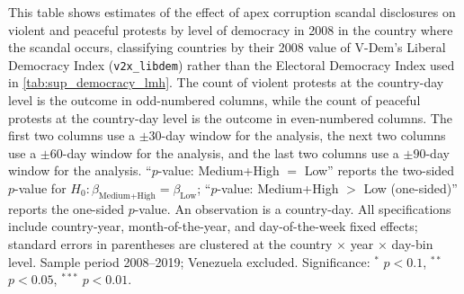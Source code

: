 \documentclass[11pt]{article}
\let\mathbetasym\beta
\renewcommand{\beta}{\ensuremath{\mathbetasym}}
\begin{document}
\begin{table}[htb!]
    \caption{Effect by 2008 level of democracy (Liberal index): Low vs.\ Medium+High.}
    \label{tab:sup_democracy_terciles_libdem_lmh}
    \begin{center}
        \scriptsize{}
    \end{center}
    \footnotesize{This table shows estimates of the effect of apex corruption scandal disclosures on violent and peaceful protests by level of democracy in 2008 in the country where the scandal occurs, classifying countries by their 2008 value of V-Dem's Liberal Democracy Index (\texttt{v2x\_libdem}) rather than the Electoral Democracy Index used in \autoref{tab:sup_democracy_lmh}. The count of violent protests at the country-day level is the outcome in odd-numbered columns, while the count of peaceful protests at the country-day level is the outcome in even-numbered columns. The first two columns use a $\pm30$-day window for the analysis, the next two columns use a $\pm60$-day window for the analysis, and the last two columns use a $\pm90$-day window for the analysis. ``$p$-value: Medium+High $=$ Low'' reports the two-sided $p$-value for $H_0:\beta_{\text{Medium+High}}=\beta_{\text{Low}}$; ``$p$-value: Medium+High $>$ Low (one-sided)'' reports the one-sided $p$-value. An observation is a country-day. All specifications include country-year, month-of-the-year, and day-of-the-week fixed effects; standard errors in parentheses are clustered at the country $\times$ year $\times$ day-bin level. Sample period 2008--2019; Venezuela excluded. Significance: $^{*}$ $p<0.1$, $^{**}$ $p<0.05$, $^{***}$ $p<0.01$.}
\end{table}
\end{document}
